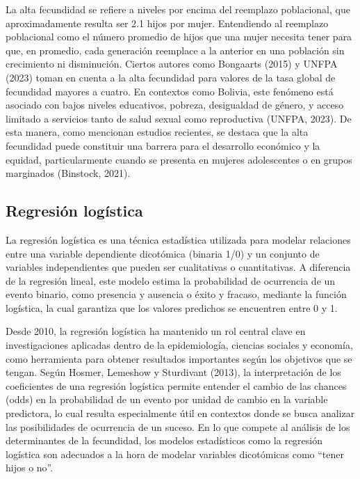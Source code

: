 \documentclass[Royal,times,sageh]{sagej}
\begin{document}
La alta fecundidad se refiere a niveles por encima del reemplazo
poblacional, que aproximadamente resulta ser 2.1 hijos por mujer.
Entendiendo al reemplazo poblacional como el número promedio de hijos
que una mujer necesita tener para que, en promedio, cada generación
reemplace a la anterior en una población sin crecimiento ni disminución.
Ciertos autores como Bongaarts (2015) y UNFPA (2023) toman en cuenta a
la alta fecundidad para valores de la tasa global de fecundidad mayores
a cuatro. En contextos como Bolivia, este fenómeno está asociado con
bajos niveles educativos, pobreza, desigualdad de género, y acceso
limitado a servicios tanto de salud sexual como reproductiva (UNFPA,
2023). De esta manera, como mencionan estudios recientes, se destaca que
la alta fecundidad puede constituir una barrera para el desarrollo
económico y la equidad, particularmente cuando se presenta en mujeres
adolescentes o en grupos marginados (Binstock, 2021).

\subsection{Regresión logística}\label{regresiuxf3n-loguxedstica}

La regresión logística es una técnica estadística utilizada para modelar
relaciones entre una variable dependiente dicotómica (binaria 1/0) y un
conjunto de variables independientes que pueden ser cualitativas o
cuantitativas. A diferencia de la regresión lineal, este modelo estima
la probabilidad de ocurrencia de un evento binario, como presencia y
ausencia o éxito y fracaso, mediante la función logística, la cual
garantiza que los valores predichos se encuentren entre 0 y 1.

Desde 2010, la regresión logística ha mantenido un rol central clave en
investigaciones aplicadas dentro de la epidemiología, ciencias sociales
y economía, como herramienta para obtener resultados importantes según
los objetivos que se tengan. Según Hosmer, Lemeshow y Sturdivant (2013),
la interpretación de los coeficientes de una regresión logística permite
entender el cambio de las chances (odds) en la probabilidad de un evento
por unidad de cambio en la variable predictora, lo cual resulta
especialmente útil en contextos donde se busca analizar las
posibilidades de ocurrencia de un suceso. En lo que compete al análisis
de los determinantes de la fecundidad, los modelos estadísticos como la
regresión logística son adecuados a la hora de modelar variables
dicotómicas como ``tener hijos o no''.
\end{document}
